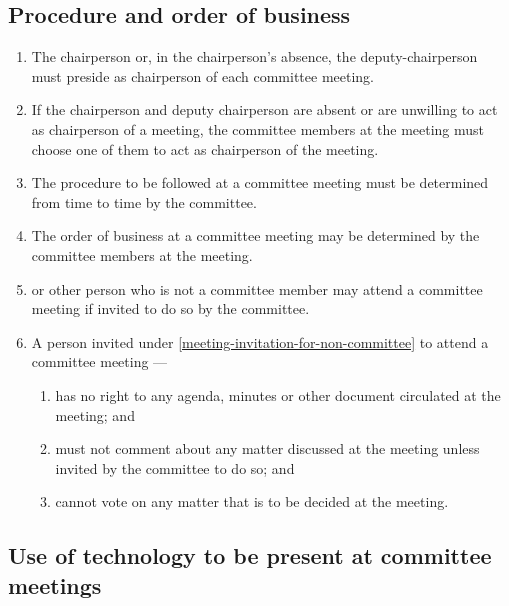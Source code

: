 \documentclass[../constitution.tex]{subfiles}
\begin{document}
\hypertarget{procedure-and-order-of-business}{%
\subsection{Procedure and order of business}\label{procedure-and-order-of-business}}

\begin{enumerate}

\item The chairperson or, in the chairperson's absence, the deputy-chairperson must preside as chairperson of each committee meeting.
\item If the chairperson and deputy chairperson are absent or are unwilling to act as chairperson of a meeting, the committee members at the meeting must choose one of them to act as chairperson of the meeting.
\item The procedure to be followed at a committee meeting must be determined from time to time by the committee.
\item The order of business at a committee meeting may be determined by the committee members at the meeting.
\item {} or other person who is not a committee member may attend a committee meeting if invited to do so by the committee. \label{meeting-invitation-for-non-committee}
\item A person invited under  \ref{meeting-invitation-for-non-committee} to attend a committee meeting ---

  \begin{enumerate}
  
  \item has no right to any agenda, minutes or other document circulated at the meeting; and
  \item must not comment about any matter discussed at the meeting unless invited by the committee to do so; and
  \item cannot vote on any matter that is to be decided at the meeting.
  \end{enumerate}
\end{enumerate}

\hypertarget{use-of-technology-to-be-present-at-committee-meetings}{%
\subsection{Use of technology to be present at committee meetings}\label{use-of-technology-to-be-present-at-committee-meetings}}
\end{document}
